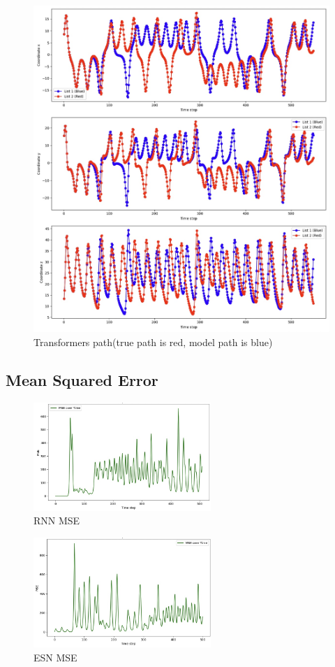 \documentclass[11pt]{article}
\begin{document}
\begin{figure}[p]
    \centering
    \includegraphics[width=\textwidth]{transformers_path.jpeg}
    \caption{Transformers path(true path is red, model path is blue)}
\end{figure}

\subsection{Mean Squared Error}
\begin{figure}[h]
\centering
\includegraphics[width=0.6\textwidth]{rnn_mse.jpeg}
\caption{RNN MSE}
\end{figure}

\begin{figure}[h]
\centering
\includegraphics[width=0.6\textwidth]{echo_mse.jpeg}
\caption{ESN MSE}
\end{figure}
\end{document}
